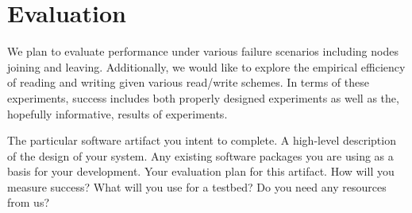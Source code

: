\documentclass[12pt]{article}
\begin{document}
\section{Evaluation}

We plan to evaluate performance under various failure scenarios including nodes joining and leaving.  Additionally, we would like to explore the empirical efficiency of reading and writing given various read/write schemes.  In terms of these experiments, success includes both properly designed experiments as well as the, hopefully informative, results of experiments.

The particular software artifact you intent to complete.
A high-level description of the design of your system.
Any existing software packages you are using as a basis for your development.
Your evaluation plan for this artifact. How will you measure success? What will you use for a testbed? Do you need any resources from us?
\end{document}
